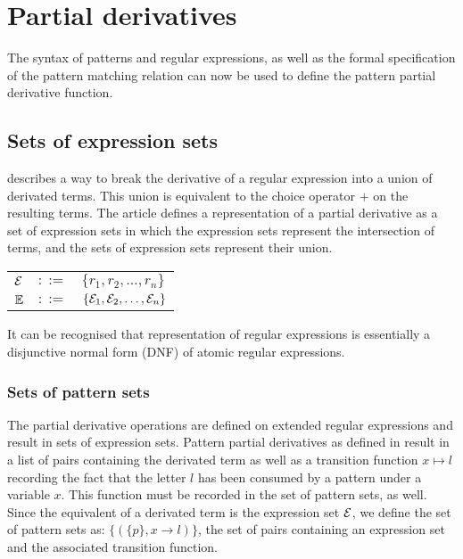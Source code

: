 \section{Partial derivatives}

The syntax of patterns and regular expressions, as well as the formal
specification of the pattern matching relation can now be used to define the
pattern partial derivative function.

\subsection{Sets of expression sets}

\cite{pd-ere} describes a way to break the derivative of a regular expression
into a union of derivated terms. This union is equivalent to the choice
operator $+$ on the resulting terms. The article defines a representation of a
partial derivative as a set of expression sets in which the expression sets
represent the intersection of terms, and the sets of expression sets represent
their union.

\begin{tabular}{lll}
   $\mathcal{E}$	& $::=$ & $\{r_1, r_2, \dots, r_n\}$ \\
   $\mathbb{E}$	& $::=$ & $\{\mathcal{E}_1, \mathcal{E}_2, \dots, \mathcal{E}_n\}$ \\
\end{tabular}

It can be recognised that representation of regular expressions is essentially
a disjunctive normal form (DNF) of atomic regular expressions.


\subsubsection{Sets of pattern sets}

The partial derivative operations are defined on extended regular expressions
and result in sets of expression sets. Pattern partial derivatives as defined
in \cite{pd-pat} result in a list of pairs containing the derivated term as
well as a transition function $x \mapsto l$ recording the fact that the letter
$l$ has been consumed by a pattern under a variable $x$. This function must be
recorded in the set of pattern sets, as well. Since the equivalent of a
derivated term is the expression set $\mathcal{E}$, we define the set of
pattern sets as: $\{ (\{ p \}, x \to l) \}$, the set of pairs containing
an expression set and the associated transition function.

